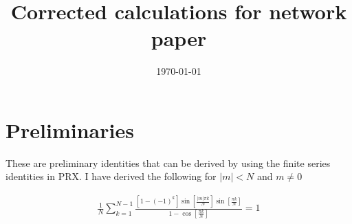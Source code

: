 \documentclass[superscriptaddress, amsmath, amssymb, aps, pre, floatfix]{revtex4-2}
\begin{document}
\title{Corrected calculations for network paper}

\date{\today}%

\begin{abstract}
\end{abstract}


\maketitle

% 
% 

\section*{Preliminaries}\label{sec:intro}


These are preliminary identities that can be derived by using the finite series identities in PRX. I have derived the following for $|m|<N$ and $m\not=0$

\begin{align}
\frac{1}{N}\sum_{k=1}^{N-1}\frac{\left[1-(-1)^k\right]\sin\left[\frac{|m|\pi k}{N}\right]\sin\left[\frac{\pi k}{N}\right]}{1-\cos\left[\frac{\pi k}{N}\right]}=1
\label{eq:id_1}
\end{align}
\end{document}
